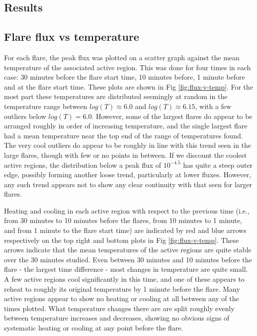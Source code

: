 \documentclass[namedreferences]{solarphysics}
\begin{document}
\begin{article}
\section{Results}

\subsection{Flare flux vs temperature}
For each flare, the peak flux was plotted on a scatter graph against the mean temperature of the associated active region. %
This was done for four times in each case: 30 minutes before the flare start time, 10 minutes before, 1 minute before and at the flare start time.
These plots are shown in Fig \ref{fig:flux-v-temp}.
For the most part these temperatures are distributed seemingly at random in the temperature range between $log(T)\approx6.0$ and $log(T)\approx6.15$, with a few outliers below $log(T)=6.0$.
However, some of the largest flares do appear to be arranged roughly in order of increasing temperature, and the single largest flare had a mean temperature near the top end of the range of temperatures found.
The very cool outliers do appear to be roughly in line with this trend seen in the large flares, though with few or no points in between.
If we discount the coolest active regions, the distribution below a peak flux of $10^{-4.5}$ has quite a steep outer edge, possibly forming another loose trend, particularly at lower fluxes.
However, any such trend appears not to show any clear continuity with that seen for larger flares.

Heating and cooling in each active region with respect to the previous time (i.e., from 30 minutes to 10 minutes before the flares, from 10 minutes to 1 minute, and from 1 minute to the flare start time) are indicated by red and blue arrows respectively on the top right and bottom plots in Fig \ref{fig:flux-v-temp}.
These arrows indicate that the mean temperatures of the active regions are quite stable over the 30 minutes studied.
Even between 30 minutes and 10 minutes before the flare - the largest time difference - most changes in temperature are quite small.
A few active regions cool significantly in this time, and one of these appears to reheat to roughly its original temperature by 1 minute before the flare.
Many active regions appear to show no heating or cooling at all between any of the times plotted.
What temperature changes there are are split roughly evenly between temperature increases and decreases, showing no obvious signs of systematic heating or cooling at any point before the flare.


\end{article}
\end{document}
